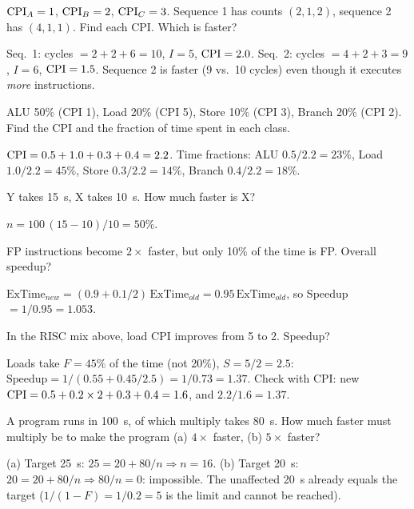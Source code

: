 \documentclass[11pt]{article}
\begin{document}
\begin{exercise}
$\mathrm{CPI}_A=1$, $\mathrm{CPI}_B=2$, $\mathrm{CPI}_C=3$. Sequence 1 has counts $(2,1,2)$,
sequence 2 has $(4,1,1)$. Find each CPI. Which is faster?
\end{exercise}
\begin{solution}
Seq.~1: cycles $=2+2+6=10$, $I=5$, $\mathrm{CPI}=2.0$.
Seq.~2: cycles $=4+2+3=9$, $I=6$, $\mathrm{CPI}=1.5$.
Sequence 2 is faster (9 vs.\ 10 cycles) even though it executes \emph{more}
instructions.
\end{solution}

\begin{exercise}
ALU 50\% (CPI 1), Load 20\% (CPI 5), Store 10\% (CPI 3), Branch 20\% (CPI 2).
Find the CPI and the fraction of time spent in each class.
\end{exercise}
\begin{solution}
$\mathrm{CPI} = 0.5+1.0+0.3+0.4 = 2.2$. Time fractions: ALU $0.5/2.2=23\%$, Load
$1.0/2.2=45\%$, Store $0.3/2.2=14\%$, Branch $0.4/2.2=18\%$.
\end{solution}

\begin{exercise}[$n\%$ faster]
Y takes 15~s, X takes 10~s. How much faster is X?
\end{exercise}
\begin{solution}
$n = 100\,(15-10)/10 = 50\%$.
\end{solution}

\begin{exercise}
FP instructions become $2\times$ faster, but only 10\% of the time is FP.
Overall speedup?
\end{exercise}
\begin{solution}
$\text{ExTime}_{new} = (0.9 + 0.1/2)\,\text{ExTime}_{old} =
0.95\,\text{ExTime}_{old}$, so Speedup $=1/0.95 = 1.053$.
\end{solution}

\begin{exercise}
In the RISC mix above, load CPI improves from 5 to 2. Speedup?
\end{exercise}
\begin{solution}
Loads take $F=45\%$ of the time (not 20\%), $S=5/2=2.5$:
$\text{Speedup}=1/(0.55+0.45/2.5) = 1/0.73 = 1.37$.
Check with CPI: new $\mathrm{CPI} = 0.5+0.2\times2+0.3+0.4 = 1.6$, and
$2.2/1.6 = 1.37$.
\end{solution}

\begin{exercise}
A program runs in 100~s, of which multiply takes 80~s. How much faster must
multiply be to make the program (a) $4\times$ faster, (b) $5\times$ faster?
\end{exercise}
\begin{solution}
(a) Target 25~s: $25 = 20 + 80/n \Rightarrow n = 16$.
(b) Target 20~s: $20 = 20 + 80/n \Rightarrow 80/n = 0$: impossible. The
unaffected 20~s already equals the target ($1/(1-F) = 1/0.2 = 5$ is the
limit and cannot be reached).
\end{solution}
\end{document}

